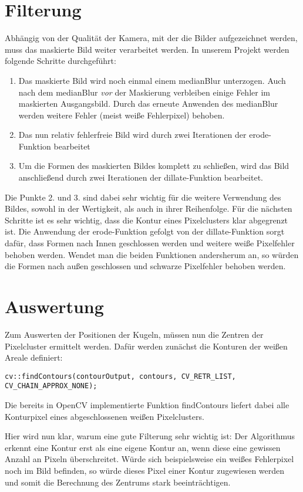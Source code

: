 \documentclass[12pt]{article}
\begin{document}
\section{Filterung}
Abhängig von der Qualität der Kamera, mit der die Bilder aufgezeichnet werden, muss das maskierte Bild weiter verarbeitet werden.  In unserem Projekt werden folgende Schritte durchgeführt:
\begin{enumerate}
\item Das maskierte Bild wird noch einmal einem medianBlur unterzogen. Auch nach dem medianBlur \emph{vor} der Maskierung verbleiben einige Fehler im maskierten Ausgangsbild. Durch das erneute Anwenden des medianBlur werden weitere Fehler (meist weiße Fehlerpixel) behoben.
\item Das nun relativ fehlerfreie Bild wird durch zwei Iterationen der erode-Funktion bearbeitet 
\item Um die Formen des maskierten Bildes komplett zu schließen, wird das Bild anschließend durch zwei Iterationen der dillate-Funktion bearbeitet.
\end{enumerate}
Die Punkte 2. und 3. sind dabei sehr wichtig für die weitere Verwendung des Bildes, sowohl in der Wertigkeit, als auch in ihrer Reihenfolge. Für die nächsten Schritte ist es sehr wichtig, dass die Kontur eines Pixelclusters klar abgegrenzt ist. Die Anwendung der erode-Funktion gefolgt von der dillate-Funktion sorgt dafür, dass Formen nach Innen geschlossen werden und weitere weiße Pixelfehler behoben werden. Wendet man die beiden Funktionen andersherum an, so würden die Formen nach außen geschlossen und schwarze Pixelfehler behoben werden.
\section{Auswertung}
Zum Auswerten der Positionen der Kugeln, müssen nun die Zentren der Pixelcluster ermittelt werden. Dafür werden zunächst die Konturen der weißen Areale definiert:
\begin{lstlisting}
cv::findContours(contourOutput, contours, CV_RETR_LIST, CV_CHAIN_APPROX_NONE);
\end{lstlisting}
Die bereits in OpenCV implementierte Funktion findContours liefert dabei alle Konturpixel eines abgeschlossenen weißen Pixelclusters. 

Hier wird nun klar, warum eine gute Filterung sehr wichtig ist: Der Algorithmus erkennt eine Kontur erst als eine eigene Kontur an, wenn diese eine gewissen Anzahl an Pixeln überschreitet. Würde sich beispielsweise ein weißes Fehlerpixel noch im Bild befinden, so würde dieses Pixel einer Kontur zugewiesen werden und somit die Berechnung des Zentrums stark beeinträchtigen.
\end{document}
